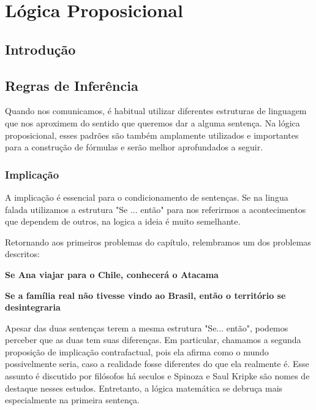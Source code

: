 \chapter{Lógica Proposicional}
\section{Introdução}

\section{Regras de Inferência}
Quando nos comunicamos, é habitual utilizar diferentes estruturas de linguagem que nos aproximem do sentido que queremos dar a alguma sentença. Na lógica proposicional, esses padrões são também amplamente utilizados e importantes para a construção de fórmulas e serão melhor aprofundados a seguir.

\subsection{Implicação} 
A implicação é essencial para o condicionamento de sentenças. Se na lingua falada utilizamos a estrutura "Se ... então" para nos referirmos a acontecimentos que dependem de outros, na logica a ideia é muito semelhante.

Retornando aos primeiros problemas do capítulo, relembramos um dos problemas descritos:
\begin{center}
\textbf{Se Ana viajar para o Chile, conhecerá o Atacama}

\textbf{Se a família real não tivesse vindo ao Brasil, então o território se desintegraria}
\end{center}

Apesar das duas sentenças terem a mesma estrutura "Se... então", podemos perceber que as duas tem suas diferenças. Em particular, chamamos a segunda proposição de implicação contrafactual, pois ela afirma como o mundo possivelmente seria, caso a realidade fosse diferentes do que ela realmente é. Esse assunto é discutido por filósofos há seculos e Spinoza e Saul Kripke são nomes de destaque nesses estudos. Entretanto, a lógica matemática se debruça mais especialmente na primeira sentença.

